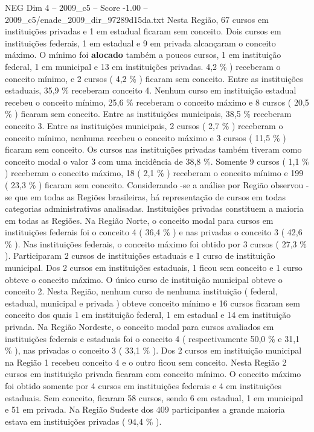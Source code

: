 \begin{textsample}{NEG Dim 4 – 2009\_c5 – Score -1.00 – 2009\_c5/enade\_2009\_dir\_97289d15da.txt}
Nesta Região, 67 cursos em instituições privadas e 1 em estadual ficaram sem conceito.
Dois cursos em instituições federais, 1 em estadual e 9 em privada alcançaram o conceito máximo.
O mínimo foi \textbf{alocado} também a poucos cursos, 1 em instituição federal, 1 em municipal e 13 em instituições privadas. 4,2 \% ) receberam o conceito mínimo, e 2 cursos ( 4,2 \% ) ficaram sem conceito.
Entre as instituições estaduais, 35,9 \% receberam conceito 4.
Nenhum curso em instituição estadual recebeu o conceito mínimo, 25,6 \% receberam o conceito máximo e 8 cursos ( 20,5 \% ) ficaram sem conceito.
Entre as instituições municipais, 38,5 \% receberam conceito 3.
Entre as instituições municipais, 2 cursos ( 2,7 \% ) receberam o conceito mínimo, nenhuma recebeu o conceito máximo e 3 cursos ( 11,5 \% ) ficaram sem conceito.
Os cursos nas instituições privadas também tiveram como conceito modal o valor 3 com uma incidência de 38,8 \%.
Somente 9 cursos ( 1,1 \% ) receberam o conceito máximo, 18 ( 2,1 \% ) receberam o conceito mínimo e 199 ( 23,3 \% ) ficaram sem conceito.
Considerando -se a análise por Região observou -se que em todas as Regiões brasileiras, há representação de cursos em todas categorias administrativas analisadas.
Instituições privadas constituem a maioria em todas as Regiões.
Na Região Norte, o conceito modal para cursos em instituições federais foi o conceito 4 ( 36,4 \% ) e nas privadas o conceito 3 ( 42,6 \% ).
Nas instituições federais, o conceito máximo foi obtido por 3 cursos ( 27,3 \% ).
Participaram 2 cursos de instituições estaduais e 1 curso de instituição municipal.
Dos 2 cursos em instituições estaduais, 1 ficou sem conceito e 1 curso obteve o conceito máximo.
O único curso de instituição municipal obteve o conceito 2.
Nesta Região, nenhum curso de nenhuma instituição ( federal, estadual, municipal e privada ) obteve conceito mínimo e 16 cursos ficaram sem conceito dos quais 1 em instituição federal, 1 em estadual e 14 em instituição privada.
Na Região Nordeste, o conceito modal para cursos avaliados em instituições federais e estaduais foi o conceito 4 ( respectivamente 50,0 \% e 31,1 \% ), nas privadas o conceito 3 ( 33,1 \% ).
Dos 2 cursos em instituição municipal na Região 1 recebeu conceito 4 e o outro ficou sem conceito.
Nesta Região 2 cursos em instituição privada ficaram com conceito mínimo.
O conceito máximo foi obtido somente por 4 cursos em instituições federais e 4 em instituições estaduais.
Sem conceito, ficaram 58 cursos, sendo 6 em estadual, 1 em municipal e 51 em privada.
Na Região Sudeste dos 409 participantes a grande maioria estava em instituições privadas ( 94,4 \% ).

\end{textsample}
